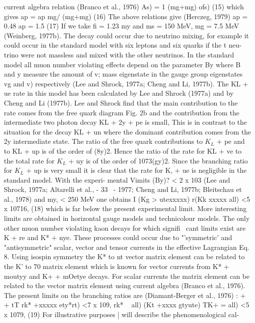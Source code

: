 \documentclass[twoside]{article}
\begin{document}
{{{{{{{{{{current algebra relation (Branco et al., 1976)
As) = 1 (mg+mg) ofs) (15)
which gives
ap = ap mg/ (mg+mg) (16)
The above relations give {(Herczeg, 1979)
ap = 0.48
ap = 1.5 (17)
If we take fi = 1.23 my and ms = 150 MeV, mg = 7.5 MeV (Weinberg, 1977b).
The decay could occur due to neutrino mixing, for example it could occur
in the standard model with six leptons and six quarks if the t neu-
trino were not massless and mixed with the other neutrinos. In the
standard model all muon number violating effects depend on the parameter
By where B and y measure the amount of v; mass eigenstate in the gauge
group eigenstates vg and v) respectively (Lee and Shrock, 1977a; Cheng
and Li, 1977b). The KL + ue rate in this model has been calculated by
Lee and Shrock (1977a) and by Cheng and Li (1977b). Lee and Shrock find
that the main contribution to the rate comes from the free quark diagram
Fig. 2b and the contribution from the intermediate two photon decay
KL + 2y + pe is small, This is in contrast to the situation for the decay
KL + un where the dominant contribution comes from the 2y intermediate
state. The ratio of the free quark contributions to $K_L $ + pe and to
KL + up is of the order of (8y)2. Hence the ratio of the rate for
KL + ve to the total rate for $K_L $ + uy is of the order of 1073(gy)2.
Since the branching ratio for $K_L $ + up is very small it is clear that the
rate for K, + ue is negligible in the standard model. With the experi-
mental Vimits (By)? < 2 x 103 (Lee and Shrock, 1977a; Altarelli et al.,
- 33 ~-
1977; Cheng and Li, 1977b; Bleitschau et al., 1978) and my, < 250 MeV one
obtains
I (Kg > utexxxxx)
r(Kk xxxxx all)
<5 x 10716, (18)
which is far below the present experimental limit. More interesting
limits are obtained in horizontal gauge models and technicolour models.
The only other muon number violating kaon decays for which signifi~
cant limits exist are K + re and K* + nye. These processes could
occur due to "'symmetric' and "antisymmetric" scalar, vector and tensor
currents in the effective Lagrangian Eq. 8. Using isospin symmetry the
K* to nt vector matrix element can be related to the K' to 70 matrix
element which is known for vector currents from K* + moutyy and K+ +
mOetye decays. For scalar currents the matrix element can be related to
the vector matrix element using current algebra (Branco et al., 1976).
The present limits on the branching ratios are (Diamant-Berger et al.,
1976) :
+ + tT
r{k* +xxxxx ety*rt) <7 x 109,
r{k* ~ all)
(Kt +xxxx gtyute)
T{K+ = all)
<5 x 1079, (19)
For illustrative purposes | will describe the phenomenological cal-
}}}}}}}}}}}}}}
\end{document}
